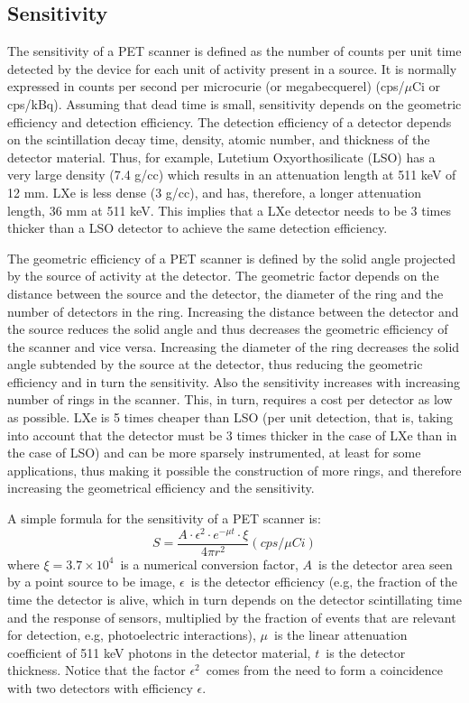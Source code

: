 \subsection{Sensitivity}

The sensitivity of a PET scanner is defined as the number of counts per unit time detected by the device for each unit of activity present in a source. It is normally expressed in counts per second per microcurie (or megabecquerel) (cps/$\mu$Ci or cps/kBq). Assuming that dead time is small, sensitivity depends on the geometric efficiency and detection efficiency. The detection efficiency of a detector depends on the scintillation decay time, density, atomic number, and thickness of the detector material. Thus, for example, Lutetium Oxyorthosilicate (LSO) has a very large density (7.4 g/cc) which results in an attenuation length at 511 keV of 12 mm. LXe is less dense (3 g/cc), and has, therefore, a longer attenuation length, 36 mm at 511 keV. This implies that a LXe detector needs to be 3 times thicker than a LSO detector to achieve the same detection efficiency.

The geometric efficiency of a PET scanner is defined by the solid angle projected by the source of activity at the detector. The geometric factor depends on the distance between the source and the detector, the diameter of the ring and the number of detectors in the ring. Increasing the distance between the detector and the source reduces the solid angle and thus decreases the geometric efficiency of the scanner and vice versa. Increasing the diameter of the ring decreases the solid angle subtended by the source at the detector, thus reducing the geometric efficiency and in turn the sensitivity. Also the sensitivity increases with increasing number of rings in the scanner. This, in turn, requires a cost per detector as low as possible. LXe is 5 times cheaper than LSO (per unit detection, that is, taking into account that the detector must be 3 times thicker in the case of LXe than in the case of LSO) and can be more sparsely instrumented, at least for some applications, thus making it possible the construction of more rings, and therefore increasing the geometrical efficiency and the sensitivity. 

A simple formula for the sensitivity of a PET scanner is:
\begin{equation}
S = \frac{A \cdot \epsilon^2 \cdot e^{-\mu t} \cdot \xi}{4 \pi r^2} (cps/\mu Ci)
\label{eq.sensi}
\end{equation}
%
where $\xi = 3.7 \times 10^4$~is a numerical conversion factor, $A$~is the detector area seen by a point source to be image, $\epsilon$~is the detector efficiency (e.g, the fraction of the time the detector is alive, which in turn depends on the detector scintillating time and the response of sensors, multiplied by the fraction of events that are relevant for detection, e.g, photoelectric interactions), $\mu$~is the linear attenuation coefficient of 511 keV photons in the detector material, $t$~is the detector thickness. Notice that the factor $\epsilon^2$~comes from the need to form a coincidence with two detectors with efficiency $\epsilon$.


